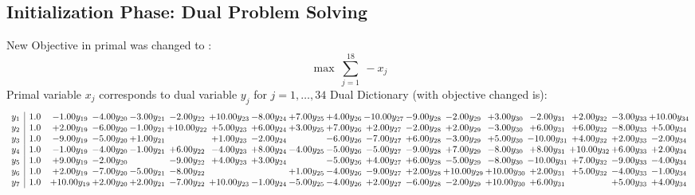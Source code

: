 \documentclass[9pt]{article}
\begin{document}
\subsection{Initialization Phase: Dual Problem Solving}
New Objective in primal was changed to : \[ \max\ \sum_{j=1}^{18}\ - x_j \] 
Primal variable $x_j$ corresponds to dual variable $y_j$ for $j = 1,\ldots,34$
Dual Dictionary (with objective changed is): 
\[\begin{array}{c| c c@{\hskip 2pt} c@{\hskip 2pt} c@{\hskip 2pt} c@{\hskip 2pt} c@{\hskip 2pt} c@{\hskip 2pt} c@{\hskip 2pt} c@{\hskip 2pt} c@{\hskip 2pt} c@{\hskip 2pt} c@{\hskip 2pt} c@{\hskip 2pt} c@{\hskip 2pt} c@{\hskip 2pt} c@{\hskip 2pt} c@{\hskip 2pt} }
 y_{1}   &  1.0 & -1.00 y_{19} & -4.00 y_{20} & -3.00 y_{21} & -2.00 y_{22} & + 10.00 y_{23} & -8.00 y_{24} & +  7.00 y_{25} & +  4.00 y_{26} & -10.00 y_{27} & -9.00 y_{28} & -2.00 y_{29} & +  3.00 y_{30} & -2.00 y_{31} & +  2.00 y_{32} & -3.00 y_{33} & + 10.00 y_{34}\\
 y_{2}   &  1.0 & +  2.00 y_{19} & -6.00 y_{20} & -1.00 y_{21} & + 10.00 y_{22} & +  5.00 y_{23} & +  6.00 y_{24} & +  3.00 y_{25} & +  7.00 y_{26} & +  2.00 y_{27} & -2.00 y_{28} & +  2.00 y_{29} & -3.00 y_{30} & +  6.00 y_{31} & +  6.00 y_{32} & -8.00 y_{33} & +  5.00 y_{34}\\
 y_{3}   &  1.0 & -9.00 y_{19} & -5.00 y_{20} & +  1.00 y_{21} &   & +  1.00 y_{23} & -2.00 y_{24} &   & -6.00 y_{26} & -7.00 y_{27} & +  6.00 y_{28} & -3.00 y_{29} & +  5.00 y_{30} & -10.00 y_{31} & +  4.00 y_{32} & +  2.00 y_{33} & -2.00 y_{34}\\
 y_{4}   &  1.0 & -1.00 y_{19} & -4.00 y_{20} & -1.00 y_{21} & +  6.00 y_{22} & -4.00 y_{23} & +  8.00 y_{24} & -4.00 y_{25} & -5.00 y_{26} & -5.00 y_{27} & -9.00 y_{28} & +  7.00 y_{29} & -8.00 y_{30} & +  8.00 y_{31} & + 10.00 y_{32} & +  6.00 y_{33} & +  2.00 y_{34}\\
 y_{5}   &  1.0 & +  9.00 y_{19} & -2.00 y_{20} &   & -9.00 y_{22} & +  4.00 y_{23} & +  3.00 y_{24} &   & -5.00 y_{26} & +  4.00 y_{27} & +  6.00 y_{28} & -5.00 y_{29} & -8.00 y_{30} & -10.00 y_{31} & +  7.00 y_{32} & -9.00 y_{33} & -4.00 y_{34}\\
 y_{6}   &  1.0 & +  2.00 y_{19} & -7.00 y_{20} & -5.00 y_{21} & -8.00 y_{22} &    &   & +  1.00 y_{25} & -4.00 y_{26} & -9.00 y_{27} & +  2.00 y_{28} & + 10.00 y_{29} & + 10.00 y_{30} & +  2.00 y_{31} & +  5.00 y_{32} & -4.00 y_{33} & -1.00 y_{34}\\
 y_{7}   &  1.0 & + 10.00 y_{19} & +  2.00 y_{20} & +  2.00 y_{21} & -7.00 y_{22} & + 10.00 y_{23} & -1.00 y_{24} & -5.00 y_{25} & -4.00 y_{26} & +  2.00 y_{27} & -6.00 y_{28} & -2.00 y_{29} & + 10.00 y_{30} & +  6.00 y_{31} &   & +  5.00 y_{33} & +  4.00 y_{34}\\

\end{array}\]
\end{document}

